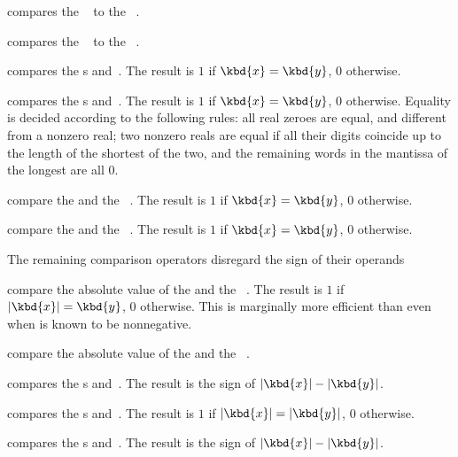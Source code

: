  compares the ~ to the
~.

 compares the ~ to the
~.

 compares the s  and~.
The result is $1$ if $\kbd{x} = \kbd{y}$, $0$ otherwise.

 compares the s  and~.
The result is $1$ if $\kbd{x} = \kbd{y}$, $0$ otherwise. Equality is decided
according to the following rules: all real zeroes are equal, and
different from a nonzero real; two nonzero reals are equal if all their
digits coincide up to the length of the shortest of the two, and the
remaining words in the mantissa of the longest are all $0$.

 compare the   and
the ~. The result is $1$ if $\kbd{x} = \kbd{y}$, $0$ otherwise.


 compare the   and
the ~. The result is $1$ if $\kbd{x} = \kbd{y}$, $0$
otherwise.


The remaining comparison operators disregard the sign of their operands

 compare the absolute value of the
  and the ~. The result is $1$ if
$|\kbd{x}| = \kbd{y}$, $0$ otherwise. This is marginally more efficient
than  even when  is known to be nonnegative.


 compare the absolute value of the
  and the ~.



 compares the s  and~.
The result is the sign of $|\kbd{x}| - |\kbd{y}|$.

 compares the s 
and~. The result is $1$ if $|\kbd{x}| = |\kbd{y}|$, $0$ otherwise.

 compares the s  and~.
The result is the sign of $|\kbd{x}| - |\kbd{y}|$.

